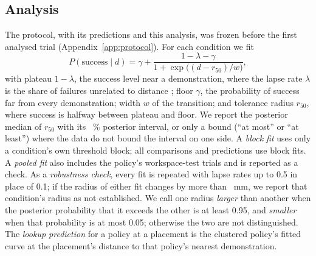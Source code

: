 \subsection{Analysis}
The protocol, with its predictions and this analysis, was frozen before the first analysed trial (Appendix~\ref{app:protocol}). %
For each condition we fit
\begin{equation}
P(\text{success} \mid d) = \gamma + \frac{1-\lambda-\gamma}{1+\exp\bigl((d-r_{50})/w\bigr)},
\label{eq:model}
\end{equation}
with plateau $1-\lambda$, the success level near a demonstration, where the lapse rate $\lambda$ is the share of failures unrelated to distance \cite{wichmann2001fitting}; floor $\gamma$, the probability of success far from every demonstration; width $w$ of the transition; and tolerance radius $r_{50}$, where success is halfway between plateau and floor. %
We report the posterior median of $r_{50}$ with its \intervalLevel~\% posterior interval, or only a bound (``at most'' or ``at least'') where the data do not bound the interval on one side.
A \emph{block fit} uses only a condition's own threshold block; all comparisons and predictions use block fits. A \emph{pooled fit} also includes the policy's workspace-test trials and is reported as a check.
As a \emph{robustness check}, every fit is repeated with lapse rates up to 0.5 in place of 0.1; if the radius of either fit changes by more than \plateauShiftLimit~mm, we report that condition's radius as not established. %
We call one radius \emph{larger} than another when the posterior probability that it exceeds the other is at least 0.95, and \emph{smaller} when that probability is at most 0.05; otherwise the two are not distinguished. %
The \emph{lookup prediction} for a policy at a placement is the clustered policy's fitted curve at the placement's distance to that policy's nearest demonstration.
